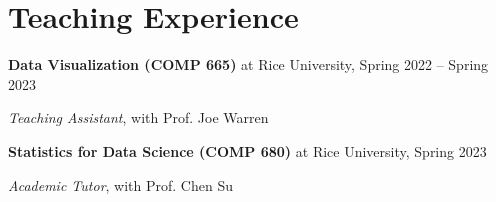 \documentclass[11pt]{article}
\begin{document}
\section*{Teaching Experience}

\textbf{Data Visualization (COMP 665)} at Rice University, \hfill Spring 2022 -- Spring 2023

\textit{Teaching Assistant}, with Prof. Joe Warren

\vspace{\lineskip}

\textbf{Statistics for Data Science (COMP 680)} at Rice University, \hfill Spring 2023

\textit{Academic Tutor}, with Prof. Chen Su
	
\end{document}
